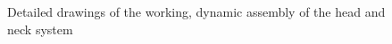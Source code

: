         \begin{figure}[h!]
        \centering
        \qquad
        \caption[Detailed drawings of the working, dynamic assembly of the head and neck system]{Detailed drawings of the working, dynamic assembly of the head and neck system}
        \label{fig:mechDesign-headSubDetail}
        \end{figure}
        
